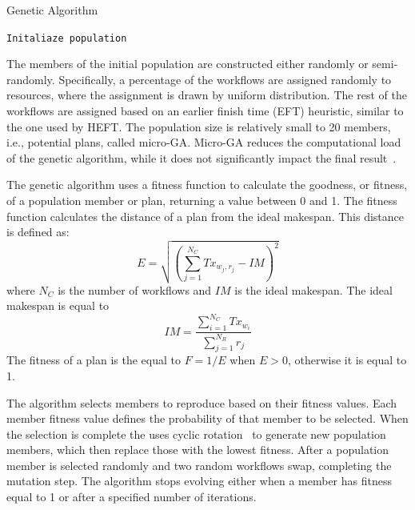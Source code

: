 \begin{algorithm}[ht]
    \caption{Genetic Algorithm}
    \label{alg:gen_algo}
    \begin{algorithmic}[1]
        \State \texttt{Initaliaze population}
        \EndWhile
        \EndProcedure
    \end{algorithmic}
\end{algorithm}

The members of the initial population are constructed either randomly or semi-randomly.
Specifically, a percentage of the workflows are assigned randomly to resources, where the assignment is drawn by uniform distribution.
The rest of the workflows are assigned based on an earlier finish time (EFT) heuristic, similar to the one used by HEFT.
The population size is relatively small to 20 members, i.e., potential plans, called micro-GA.
Micro-GA reduces the computational load of the genetic algorithm, while it does not significantly impact the final result~\cite{zomaya2001observations}.

The genetic algorithm uses a fitness function to calculate the goodness, or fitness, of a population member or plan, returning a value between 0 and 1.
The fitness function calculates the distance of a plan from the ideal makespan.
This distance is defined as:
\begin{equation}
E = \sqrt{(\sum_{j=1}^{N_{C}}Tx_{w_{j},r_{j}} - IM)^2}
\label{eq:fitness}
\end{equation}
where $N_{C}$ is the number of workflows and $IM$ is the ideal makespan.
The ideal makespan is equal to
\begin{equation}
IM = \frac{\sum_{i=1}^{N_{C}}Tx_{w_{i}}}{\sum_{j=1}^{N_{R}}r_{j}}
\label{eq:ideal_fitness}
\end{equation}
The fitness of a plan is the equal to $F = 1 /E$ when $E > 0$, otherwise it is equal to 1.

The algorithm selects members to reproduce based on their fitness values.
Each member fitness value defines the probability of that member to be selected.
When the selection is complete the uses  cyclic rotation~\cite{oliver1987study} to generate new population members, which then replace those with the lowest fitness.
After a population member is selected randomly and two random workflows swap, completing the mutation step.
The algorithm stops evolving either when a member has fitness equal to 1 or after a specified number of iterations.

